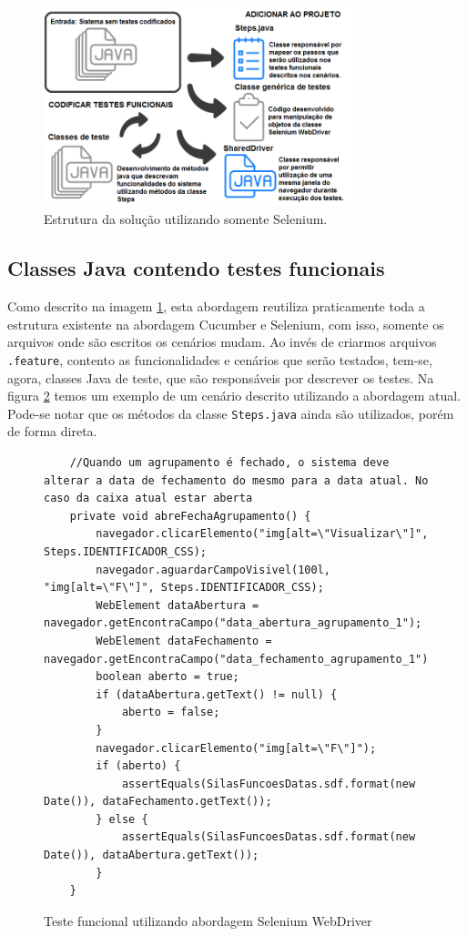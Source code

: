 \documentclass[tg]{mdtufsm}
\begin{document}
\begin{figure}[!htb]
	\centering
	\includegraphics[width=0.8\textwidth]{solucao3}
	\caption{Estrutura da solução utilizando somente Selenium.}
	\label{fig:solucao3}
\end{figure}

\subsection{Classes Java contendo testes funcionais}
Como descrito na imagem \ref{fig:solucao3}, esta abordagem reutiliza praticamente toda a estrutura existente na abordagem Cucumber e Selenium, com isso, somente os arquivos onde são escritos os cenários mudam. Ao invés de criarmos arquivos \texttt{.feature}, contento as funcionalidades e cenários que serão testados, tem-se, agora, classes Java de teste, que são responsáveis por descrever os testes.
Na figura \ref{code:seleniumTeste} temos um exemplo de um cenário descrito utilizando a abordagem atual.  Pode-se notar que os métodos da classe \texttt{Steps.java} ainda são utilizados, porém de forma direta.

\begin{figure}[!htt]
	\begin{lstlisting}
	//Quando um agrupamento é fechado, o sistema deve alterar a data de fechamento do mesmo para a data atual. No caso da caixa atual estar aberta
	private void abreFechaAgrupamento() {
		navegador.clicarElemento("img[alt=\"Visualizar\"]", Steps.IDENTIFICADOR_CSS);
		navegador.aguardarCampoVisivel(100l, "img[alt=\"F\"]", Steps.IDENTIFICADOR_CSS);
		WebElement dataAbertura = navegador.getEncontraCampo("data_abertura_agrupamento_1");
		WebElement dataFechamento = navegador.getEncontraCampo("data_fechamento_agrupamento_1");
		boolean aberto = true;
		if (dataAbertura.getText() != null) {
			aberto = false;
		}
		navegador.clicarElemento("img[alt=\"F\"]");
		if (aberto) {
			assertEquals(SilasFuncoesDatas.sdf.format(new Date()), dataFechamento.getText());
		} else {
			assertEquals(SilasFuncoesDatas.sdf.format(new Date()), dataAbertura.getText());
		}
	}	
	\end{lstlisting}
	\caption{Teste funcional utilizando abordagem Selenium WebDriver}
	\label{code:seleniumTeste}
\end{figure}
\end{document}
